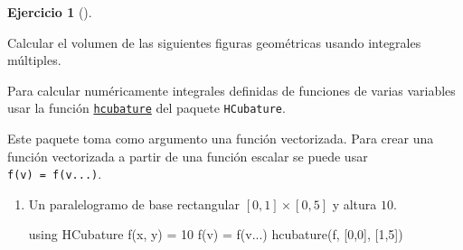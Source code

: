 \documentclass[
  a4paper,
]{scrreport}
\newenvironment{Shaded}{\begin{snugshade}}{\end{snugshade}}
\newcommand{\BuiltInTok}[1]{\textcolor[rgb]{0.00,0.23,0.31}{#1}}
\newcommand{\FloatTok}[1]{\textcolor[rgb]{0.68,0.00,0.00}{#1}}
\newcommand{\FunctionTok}[1]{\textcolor[rgb]{0.28,0.35,0.67}{#1}}
\newcommand{\ImportTok}[1]{\textcolor[rgb]{0.00,0.46,0.62}{#1}}
\newcommand{\NormalTok}[1]{\textcolor[rgb]{0.00,0.23,0.31}{#1}}
\newcommand{\OperatorTok}[1]{\textcolor[rgb]{0.37,0.37,0.37}{#1}}
\theoremstyle{definition}
\newtheorem{exercise}{Ejercicio}[chapter]
\theoremstyle{remark}
\begin{document}
\begin{exercise}[]\protect\hypertarget{exr-volumen-figuras-geometricas}{}\label{exr-volumen-figuras-geometricas}

Calcular el volumen de las siguientes figuras geométricas usando
integrales múltiples.

\begin{tcolorbox}[enhanced jigsaw, opacitybacktitle=0.6, bottomrule=.15mm, opacityback=0, colback=white, left=2mm, coltitle=black, rightrule=.15mm, breakable, bottomtitle=1mm, leftrule=.75mm, title=\textcolor{quarto-callout-note-color}{\faInfo}\hspace{0.5em}{Ayuda}, titlerule=0mm, toptitle=1mm, colbacktitle=quarto-callout-note-color!10!white, colframe=quarto-callout-note-color-frame, toprule=.15mm, arc=.35mm]

Para calcular numéricamente integrales definidas de funciones de varias
variables usar la función
\href{https://juliapackages.com/p/hcubature}{\texttt{hcubature}} del
paquete \texttt{HCubature}.

Este paquete toma como argumento una función vectorizada. Para crear una
función vectorizada a partir de una función escalar se puede usar
\texttt{f(v)\ =\ f(v...)}.

\end{tcolorbox}

\begin{enumerate}
\def\labelenumi{\alph{enumi}.}
\item
  Un paralelogramo de base rectangular \([0,1]\times [0,5]\) y altura
  \(10\).

  \begin{tcolorbox}[enhanced jigsaw, opacitybacktitle=0.6, bottomrule=.15mm, opacityback=0, colback=white, left=2mm, coltitle=black, rightrule=.15mm, breakable, bottomtitle=1mm, leftrule=.75mm, title=\textcolor{quarto-callout-tip-color}{\faLightbulb}\hspace{0.5em}{Solución}, titlerule=0mm, toptitle=1mm, colbacktitle=quarto-callout-tip-color!10!white, colframe=quarto-callout-tip-color-frame, toprule=.15mm, arc=.35mm]

\begin{Shaded}
\begin{Highlighting}[]
\ImportTok{using} \BuiltInTok{HCubature}
\FunctionTok{f}\NormalTok{(x, y) }\OperatorTok{=} \FloatTok{10}
\FunctionTok{f}\NormalTok{(v) }\OperatorTok{=} \FunctionTok{f}\NormalTok{(v}\OperatorTok{...}\NormalTok{)}
\FunctionTok{hcubature}\NormalTok{(f, [}\FloatTok{0}\NormalTok{,}\FloatTok{0}\NormalTok{], [}\FloatTok{1}\NormalTok{,}\FloatTok{5}\NormalTok{])}
\end{Highlighting}
\end{Shaded}


\end{tcolorbox}
\end{enumerate}
\end{exercise}
\end{document}
